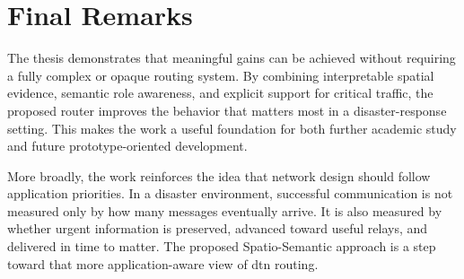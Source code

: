 \section*{Final Remarks}
The thesis demonstrates that meaningful gains can be achieved without requiring a fully complex or opaque routing system. By combining interpretable spatial evidence, semantic role awareness, and explicit support for critical traffic, the proposed router improves the behavior that matters most in a disaster-response setting. This makes the work a useful foundation for both further academic study and future prototype-oriented development.

More broadly, the work reinforces the idea that network design should follow application priorities. In a disaster environment, successful communication is not measured only by how many messages eventually arrive. It is also measured by whether urgent information is preserved, advanced toward useful relays, and delivered in time to matter. The proposed Spatio-Semantic approach is a step toward that more application-aware view of \ac{dtn} routing.
